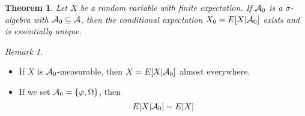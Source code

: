 \documentclass[10pt, oneside, reqno]{amsart}
\theoremstyle{plain}%
\newtheorem{thm}{Theorem}[section]
\theoremstyle{definition}
\theoremstyle{remark}
\newtheorem*{rem}{Remark}
\renewcommand{\phi}{\varphi}
\begin{document}
\begin{thm}
	Let $X$ be a random variable with finite expectation.  If $\mathcal{A}_0$ is a $\sigma$-algebra with $\mathcal{A}_0 \subseteq \mathcal{A}$, then the conditional expectation $X_0 = E[X | \mathcal{A}_0]$ exists and is essentially unique.
\end{thm}

\begin{rem}
	\begin{itemize}
		\item If $X$ is $\mathcal{A}_0$-measurable, then $X = E[X | \mathcal{A}_0]$ almost everywhere.
		\item If we set $\siga_0 = \{ \phi, \Omega \}$, then \[
			E[X | \mathcal{A}_0] = E[X]
		\] 
	\end{itemize}
\end{rem}



\end{document}
